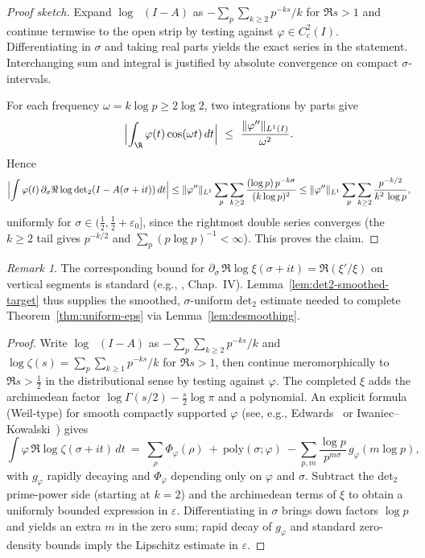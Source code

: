 \documentclass[11pt]{article}
\theoremstyle{remark}
\newtheorem{remark}[theorem]{Remark}
\DeclareMathOperator{\dettwo}{det_2}
\begin{document}
\begin{proof}[Proof sketch]
Expand $\log\dettwo(I-A)$ as $-\sum_{p}\sum_{k\ge2}p^{-ks}/k$ for $\Re s>1$ and continue termwise to the open strip by testing against $\varphi\in C_c^2(I)$. Differentiating in $\sigma$ and taking real parts yields the exact series in the statement. Interchanging sum and integral is justified by absolute convergence on compact $\sigma$-intervals.

For each frequency $\omega=k\log p\ge 2\log 2$, two integrations by parts give
\[
\Bigl|\int_{\R}\varphi(t)\cos(\omega t)\,dt\Bigr|\ \le\ \frac{\|\varphi''\|_{L^1(I)}}{\omega^2}.
\]
Hence
\[
\Bigl|\int \varphi(t)\,\partial_\sigma\Re\log\dettwo(I-A(\sigma+it))\,dt\Bigr|
\le \|\varphi''\|_{L^1}\sum_{p}\sum_{k\ge2}\frac{(\log p)\,p^{-k\sigma}}{(k\log p)^2}
\le \|\varphi''\|_{L^1}\sum_{p}\sum_{k\ge2}\frac{p^{-k/2}}{k^2\,\log p},
\]
uniformly for $\sigma\in(\tfrac12,\tfrac12+\varepsilon_0]$, since the rightmost double series converges (the $k\ge2$ tail gives $p^{-k/2}$ and $\sum_{p}(p\log p)^{-1}<\infty$). This proves the claim.
\end{proof}

\begin{remark}
The corresponding bound for $\partial_\sigma\,\Re\log\xi(\sigma+it)=\Re(\xi'/\xi)$ on vertical segments is standard (e.g., \cite{TitchmarshZeta}, Chap.~IV). Lemma~\ref{lem:det2-smoothed-target} thus supplies the smoothed, $\sigma$-uniform det$_2$ estimate needed to complete Theorem~\ref{thm:uniform-eps} via Lemma~\ref{lem:desmoothing}.
\end{remark}
\begin{proof}
Write $\log\dettwo(I-A)$ as $-\sum_{p}\sum_{k\ge 2} p^{-ks}/k$ and $\log\zeta(s)=\sum_{p}\sum_{k\ge 1} p^{-ks}/k$ for $\Re s>1$, then continue meromorphically to $\Re s>\tfrac12$ in the distributional sense by testing against $\varphi$. The completed $\xi$ adds the archimedean factor $\log\Gamma(s/2)-\tfrac{s}{2}\log\pi$ and a polynomial. An explicit formula (Weil-type) for smooth compactly supported $\varphi$ (see, e.g., Edwards~\cite[Ch.~1, §5]{Edwards} or Iwaniec--Kowalski~\cite[Ch.~5]{IwaniecKowalski}) gives
\[
 \int \varphi\,\Re\log\zeta(\sigma+it)\,dt\ =\ \sum_{\rho} \Phi_{\varphi}(\rho)\ +\ \text{poly}(\sigma;\varphi)\ -\sum_{p,m}\frac{\log p}{p^{m\sigma}}\,g_{\varphi}(m\log p),
\]
with $g_{\varphi}$ rapidly decaying and $\Phi_{\varphi}$ depending only on $\varphi$ and $\sigma$. Subtract the det$_2$ prime-power side (starting at $k=2$) and the archimedean terms of $\xi$ to obtain a uniformly bounded expression in $\varepsilon$. Differentiating in $\sigma$ brings down factors $\log p$ and yields an extra $m$ in the zero sum; rapid decay of $g_{\varphi}$ and standard zero-density bounds imply the Lipschitz estimate in $\varepsilon$.
\end{proof}
\end{document}
